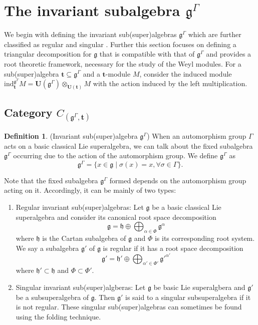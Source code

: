 \documentclass[11pt]{amsart}
\theoremstyle{plain}
\theoremstyle{definition}
\newtheorem{defn}[thm]{Definition}
\newcommand{\g}{\mathfrak{g}}
\newcommand{\h}{\mathfrak{h}}
\begin{document}
\section{The invariant subalgebra $\g^{\Gamma}$}\label{sec:1}
We begin with defining the invariant sub(super)algebras $\g^{\Gamma}$ which are further classified as regular and singular \cite{Frappat2000}. Further this section focuses on defining a triangular decomposition for $\g$ that is compatible with that of $\g^{\Gamma}$ and provides a root theoretic framework, necessary for the study of the Weyl modules. For a sub(super)algebra $\mathbf{t}\subseteq\g^{\Gamma}$ and a $\mathbf{t}$-module $M$, consider the induced module
  $\mathrm{ind}^{\g^{\Gamma}}_\mathbf{t}M=\mathbf{U}(\g^{\Gamma})\otimes_{\mathbf{U}(\mathbf{t})}M $
with the action induced by the left multiplication.
\subsection{Category $C_{(\g^{\Gamma},\mathbf{t})}$}
\begin{defn}(Invariant sub(super)algebra $\g^{\Gamma}$)
  When an automorphism group $\Gamma$ acts on a basic classical Lie superalgebra, we can talk about the fixed subalgebra $\g^{\Gamma}$ occurring due to the action of the automorphism group. We define $\g^{\Gamma}$ as
\begin{equation*}
    \g^{\Gamma}=\{x\in\g \mid \sigma(x)=x, \forall \sigma\in\Gamma\}.
\end{equation*}  
\end{defn}

Note that the fixed subalgebra $\g^{\Gamma}$ formed depends on the automorphism group acting on it. Accordingly, it can be mainly of two types:
\begin{enumerate}[label=(\alph*)]
\item Regular invariant sub(super)algebras:
Let $\g$ be a basic classical Lie superalgebra and consider its canonical root space decomposition 
\begin{equation*}
        \g=\h\oplus\bigoplus_{\alpha\in\Phi}\g^{\alpha}
\end{equation*}
where $\h$ is the Cartan subalgebra of $\g$ and $\Phi$ is its corresponding root system. We say a subalgebra $\g'$ of $\g$ is regular if it has a root space decomposition 
\begin{equation*}
\g'=\h'\oplus\bigoplus_{\alpha'\in\Phi'}\g'^{\alpha'}
\end{equation*}
where $\h'\subset\h$ and $\Phi\subset\Phi'$.
\item Singular invariant sub(super)algberas: Let $\g$ be basic Lie superalgbera and $\g'$ be a subsuperalgebra of $\g$. Then $\g'$ is said to a singular subsuperalgebra if it is not regular. These singular sub(super)algebras can sometimes be found using the folding technique. 
\end{enumerate}
\end{document}
